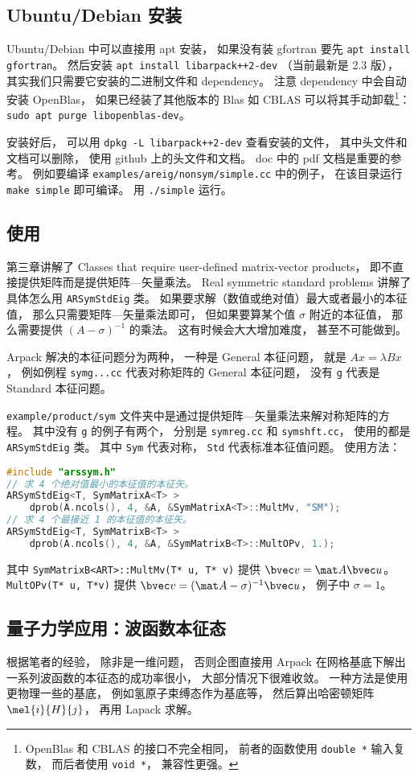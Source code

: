 \subsection{Ubuntu/Debian 安装}
Ubuntu/Debian 中可以直接用 apt 安装， 如果没有装 gfortran 要先 \verb`apt install gfortran`。 然后安装 \verb`apt install libarpack++2-dev` （当前最新是 2.3 版）， 其实我们只需要它安装的二进制文件和 dependency。 注意 dependency 中会自动安装 OpenBlas， 如果已经装了其他版本的 Blas 如 CBLAS 可以将其手动卸载\footnote{OpenBlas 和 CBLAS 的接口不完全相同， 前者的函数使用 \lstinline|double *| 输入复数， 而后者使用 \lstinline|void *|， 兼容性更强。}： \verb`sudo apt purge libopenblas-dev`。

安装好后， 可以用 \verb`dpkg -L libarpack++2-dev` 查看安装的文件， 其中头文件和文档可以删除， 使用 github 上的头文件和文档。 doc 中的 pdf 文档是重要的参考。 例如要编译 \verb`examples/areig/nonsym/simple.cc` 中的例子， 在该目录运行 \verb`make simple` 即可编译。 用 \verb`./simple` 运行。

\subsection{使用}
第三章讲解了 Classes that require user-defined matrix-vector products， 即不直接提供矩阵而是提供矩阵—矢量乘法。 Real symmetric standard problems 讲解了具体怎么用 \verb`ARSymStdEig` 类。 如果要求解（数值或绝对值）最大或者最小的本征值， 那么只需要矩阵—矢量乘法即可， 但如果要算某个值 $\sigma$ 附近的本征值， 那么需要提供 $(A - \sigma)^{-1}$ 的乘法。 这有时候会大大增加难度， 甚至不可能做到。

Arpack 解决的本征问题分为两种， 一种是 General 本征问题， 就是 $Ax = \lambda Bx$， 例如例程 \verb`symg...cc` 代表对称矩阵的 General 本征问题， 没有 \verb`g` 代表是 Standard 本征问题。

\verb`example/product/sym` 文件夹中是通过提供矩阵—矢量乘法来解对称矩阵的方程。 其中没有 \verb`g` 的例子有两个， 分别是 \verb`symreg.cc` 和 \verb`symshft.cc`， 使用的都是 \verb`ARSymStdEig` 类。 其中 \verb`Sym` 代表对称， \verb`Std` 代表标准本征值问题。 使用方法：
\begin{lstlisting}[language=cpp]
#include "arssym.h"
// 求 4 个绝对值最小的本征值的本征矢。
ARSymStdEig<T, SymMatrixA<T> >
    dprob(A.ncols(), 4, &A, &SymMatrixA<T>::MultMv, "SM");
// 求 4 个最接近 1 的本征值的本征矢。
ARSymStdEig<T, SymMatrixB<T> >
    dprob(A.ncols(), 4, &A, &SymMatrixB<T>::MultOPv, 1.);
\end{lstlisting}
其中 \verb`SymMatrixB<ART>::MultMv(T* u, T* v)` 提供 $\bvec v = \mat A\bvec u$。 \verb`MultOPv(T* u, T*v)` 提供 $\bvec v = (\mat A - \sigma)^{-1}\bvec u$， 例子中 $\sigma = 1$。

\subsection{量子力学应用：波函数本征态}
根据笔者的经验， 除非是一维问题， 否则企图直接用 Arpack 在网格基底下解出一系列波函数的本征态的成功率很小， 大部分情况下很难收敛。 一种方法是使用更物理一些的基底， 例如氢原子束缚态作为基底等， 然后算出哈密顿矩阵 $\mel{i}{H}{j}$， 再用 Lapack 求解。
